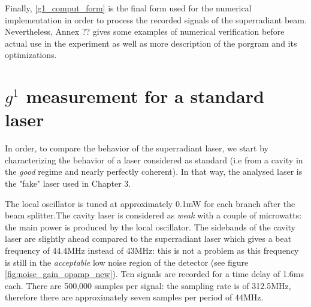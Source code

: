 \documentclass[10pt]{report}
\begin{document}
Finally, \eqref{g1_comput_form} is the final form used for the numerical implementation in order to process the recorded signals of the superradiant beam. Nevertheless, Annex ?? gives some examples of numerical verification before actual use in the experiment as well as more description of the porgram and its optimizations.

\section{$g^1$ measurement for a standard laser}

In order, to compare the behavior of the superradiant laser, we start by characterizing the behavior of a laser considered as standard (i.e from a cavity in the \textit{good} regime and nearly perfectly coherent). In that way, the analysed laser is the "fake" laser used in Chapter 3.

The local oscillator is tuned at approximately 0.1mW for each branch after the beam splitter.The cavity laser is considered as \textit{weak} with a couple of microwatts: the main power is produced by the local oscillator. The sidebands of the cavity laser are slightly ahead compared to the superradiant laser which gives a beat frequency of 44.4MHz instead of 43MHz: this is not a problem as this frequency is still in the \textit{acceptable} low noise region of the detector (see figure \ref{fig:noise_gain_opamp_new}). Ten signals are recorded for a time delay of 1.6ms each. There are 500,000 samples per signal: the sampling rate is of 312.5MHz, therefore there are approximately seven samples per period of 44MHz.
\end{document}
